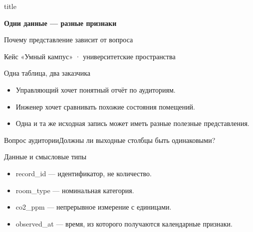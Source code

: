 \documentclass[aspectratio=169,10pt]{beamer}
\begin{document}
\begin{frame}[plain]
\begin{beamercolorbox}[wd=\paperwidth,ht=\paperheight,sep=1.4cm,center]{title}
\vspace*{1.0cm}{\large Данные как основа ИИ · семестр 2}\par\vspace{1cm}
{\fontsize{30}{38}\selectfont\bfseries Одни данные — разные признаки}\par\vspace{0.6cm}
{\large Почему представление зависит от вопроса}\par\vfill{\small Кейс «Умный кампус» · университетские пространства}
\end{beamercolorbox}\end{frame}
\begin{frame}[t]{Одна таблица, два заказчика}
\begin{itemize}
\item Управляющий хочет понятный отчёт по аудиториям.
\vspace{4pt}
\item Инженер хочет сравнивать похожие состояния помещений.
\vspace{4pt}
\item Одна и та же исходная запись может иметь разные полезные представления.
\vspace{4pt}
\end{itemize}
\vfill\begin{alertblock}{Вопрос аудитории}Должны ли выходные столбцы быть одинаковыми?\end{alertblock}
\end{frame}
\begin{frame}[t]{Данные и смысловые типы}
\begin{itemize}
\item record\_id — идентификатор, не количество.
\vspace{4pt}
\item room\_type — номинальная категория.
\vspace{4pt}
\item co2\_ppm — непрерывное измерение с единицами.
\vspace{4pt}
\item observed\_at — время, из которого получаются календарные признаки.
\vspace{4pt}
\end{itemize}
\end{frame}
\end{document}
